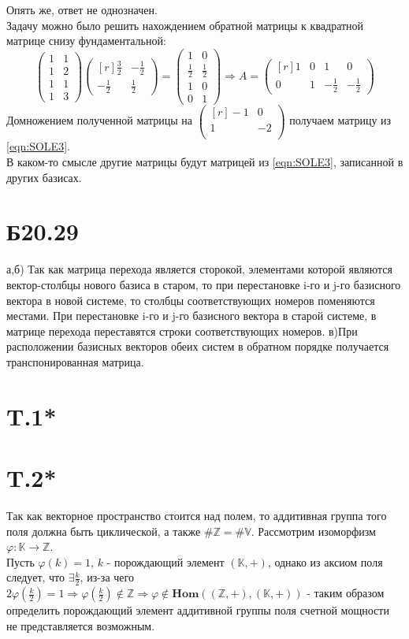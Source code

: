 \documentclass[a4paper,12pt]{article} %
\begin{document}
Опять же, ответ не однозначен.\\
Задачу можно было решить нахождением обратной матрицы к квадратной матрице снизу фундаментальной:
$$\begin{pmatrix*}
1&1\\
1&2\\
1&1\\
1&3
\end{pmatrix*}{\begin{pmatrix*}[r]
\frac{3}{2}&-\frac{1}{2}\\
-\frac{1}{2}&\frac{1}{2}
\end{pmatrix*}}=\begin{pmatrix*}
1&0\\
\frac{1}{2}&\frac{1}{2}\\
1&0\\
0&1
\end{pmatrix*}\Rightarrow A=\begin{pmatrix*}[r]
1&0&1&0\\
0&1&-\frac{1}{2}&-\frac{1}{2}
\end{pmatrix*}$$
Домножением полученной матрицы на $\begin{pmatrix*}[r]
-1&0\\
1&-2\\
\end{pmatrix*}$
получаем матрицу из \eqref{eqn:SOLE3}. \\
В каком-то смысле другие матрицы будут матрицей из \eqref{eqn:SOLE3}, записанной в других базисах.
\section*{Б20.29}
а,б) Так как матрица перехода является сторокой, элементами которой являются вектор-столбцы нового базиса в старом, то  при перестановке i-го и j-го базисного вектора в новой системе, то столбцы соответствующих номеров поменяются местами. При перестановке i-го и j-го базисного вектора в старой системе, в матрице перехода переставятся строки соответствующих номеров.
в)При расположении базисных векторов обеих систем в обратном порядке получается транспонированная матрица.
\section*{T.1*}
\section*{T.2*}
Так как векторное пространство стоится над полем, то аддитивная группа того поля должна быть циклической, а также $\#\mathbb{Z}=\#\mathbb{V}$. Рассмотрим изоморфизм $\varphi:\mathbb{K}\to\mathbb{Z}$.\\
Пусть $\varphi(k)=1$, $k$ - порождающий элемент $(\mathbb{K},+)$, однако из аксиом поля следует, что $\exists \frac{k}{2}$, из-за чего $2\varphi\left(\frac{k}{2}\right)=1\Rightarrow\varphi\left(\frac{k}{2}\right)\not\in\mathbb{Z}\Rightarrow \varphi \not\in\mathbf{Hom}((\mathbb{Z},+),(\mathbb{K},+))$ - таким образом определить порождающий элемент аддитивной группы поля счетной мощности не представляется возможным. 
\end{document}
